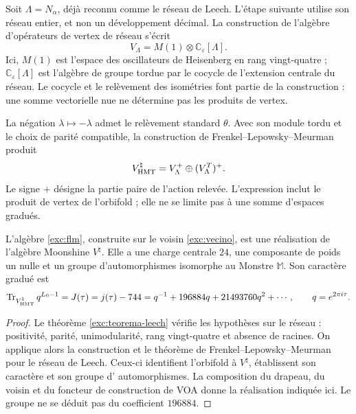 Soit $\Lambda=N_\alpha$, déjà reconnu comme le réseau de Leech. L'étape suivante utilise son réseau entier, et non un développement décimal. La construction de l'algèbre d'opérateurs de vertex de réseau s'écrit
\[
 V_\Lambda=M(1)\otimes\mathbb C_\varepsilon[\Lambda].
\]
Ici, $M(1)$ est l'espace des oscillateurs de Heisenberg en rang vingt-quatre ; $\mathbb C_\varepsilon[\Lambda]$ est l'algèbre de groupe tordue par le cocycle de l'extension centrale du réseau. Le cocycle et le relèvement des isométries font partie de la construction : une somme vectorielle nue ne détermine pas les produits de vertex.

La négation $\lambda\mapsto-\lambda$ admet le relèvement standard
$\theta$. Avec son module tordu et le choix de parité compatible,
la construction de Frenkel--Lepowsky--Meurman produit
\begin{equation}
 V^\natural_{\rm HMT}
   =V_\Lambda^+\oplus(V_\Lambda^T)^+.
 \label{exc:flm}
\end{equation}
Le signe $+$ désigne la partie paire de l'action relevée. L'expression
inclut le produit de vertex de l'orbifold ; elle ne se limite pas à une somme
d'espaces gradués.

\begin{theorem}
\label{exc:moonshine}
L'algèbre \eqref{exc:flm}, construite sur le voisin
\eqref{exc:vecino}, est une réalisation de l'algèbre Moonshine
$V^\natural$. Elle a une charge centrale $24$, une composante de poids un nulle
et un groupe d'automorphismes isomorphe au Monstre $\mathbb M$. Son caractère
gradué est
\begin{equation}
 \operatorname{Tr}_{V^\natural_{\rm HMT}}q^{L_0-1}
   =J(\tau)=j(\tau)-744
   =q^{-1}+196884q+21493760q^2+\cdots,
 \qquad q=e^{2\pi i\tau}.
 \label{exc:j}
\end{equation}
\end{theorem}

\begin{proof}
Le théorème \ref{exc:teorema-leech} vérifie les hypothèses sur le réseau :
positivité, parité, unimodularité, rang vingt-quatre et absence de
racines. On applique alors la construction et le théorème de
Frenkel--Lepowsky--Meurman pour le réseau de Leech. Ceux-ci identifient
l'orbifold à $V^\natural$, établissent son caractère et son groupe d'
automorphismes. La composition du drapeau, du voisin et du foncteur
de construction de VOA donne la réalisation indiquée ici. Le groupe ne se déduit
pas du coefficient $196884$.
\end{proof}

